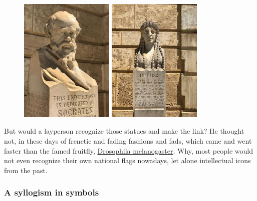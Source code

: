 \documentclass[
  a4paper,
]{article}
\begin{document}
\begin{figure}[h]
  \begin{minipage}[b]{0.5\textwidth}
    \centering
    \includegraphics[height=60mm]{images/socrates-close-up.jpg}
  \end{minipage}\hfill
  \begin{minipage}[b]{0.5\textwidth}
    \centering
    \includegraphics[height=60mm]{images/diotima-2.jpg}
  \end{minipage}
\end{figure}

But would a layperson recognize those statues and make the link? He
thought not, in these days of frenetic and fading fashions and fads,
which came and went faster than the famed fruitfly,
\href{https://en.wikipedia.org/wiki/Drosophila_melanogaster\#Lifecycle_and_reproduction}{Drosophila
melanogaster}. Why, most people would not even recognize their own
national flags nowadays, let alone intellectual icons from the past.

\hypertarget{a-syllogism-in-symbols}{%
\subsubsection{A syllogism in symbols}\label{a-syllogism-in-symbols}}
\end{document}
